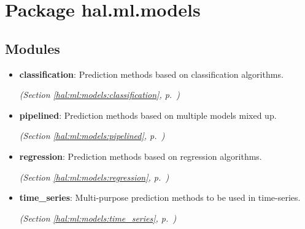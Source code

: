 %
%
%


\section{Package hal.ml.models}

    \label{hal:ml:models}


\subsection{Modules}

\begin{itemize}
\setlength{\parskip}{0ex}
\item \textbf{classification}: Prediction methods based on classification algorithms. 


  \textit{(Section \ref{hal:ml:models:classification}, p.~\pageref{hal:ml:models:classification})}

\item \textbf{pipelined}: Prediction methods based on multiple models mixed up. 


  \textit{(Section \ref{hal:ml:models:pipelined}, p.~\pageref{hal:ml:models:pipelined})}

\item \textbf{regression}: Prediction methods based on regression algorithms. 


  \textit{(Section \ref{hal:ml:models:regression}, p.~\pageref{hal:ml:models:regression})}

\item \textbf{time\_series}: Multi-purpose prediction methods to be used in time-series. 


  \textit{(Section \ref{hal:ml:models:time_series}, p.~\pageref{hal:ml:models:time_series})}

\end{itemize}


